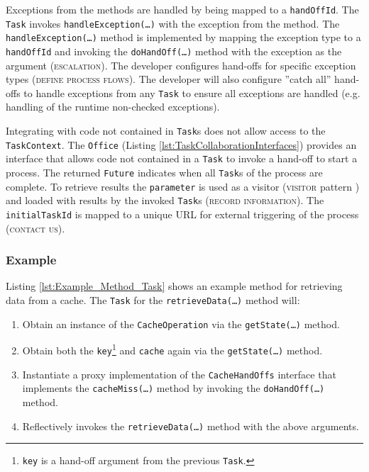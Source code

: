 \documentclass[prodmode]{style/acmlarge}
\begin{document}
Exceptions from the methods are handled by being mapped to a \texttt{handOffId}.
The \texttt{Task} invokes \texttt{handle\-Excep\-tion(\ldots)} with the
exception from the method.  The \texttt{handleException(\ldots)} method is
implemented by mapping the exception type to a \texttt{handOffId} and invoking
the \texttt{doHandOff(\ldots)} method with the exception as the argument
(\textsc{escalation}).  The developer configures hand-offs for specific
exception types (\textsc{define process flows}).  The developer will also
configure ''catch all'' hand-offs to handle exceptions from any \texttt{Task} to
ensure all exceptions are handled (e.g. handling of the runtime non-checked
exceptions).

Integrating with code not contained in \texttt{Task}s does not allow access to
the \texttt{TaskContext}.  The \texttt{Office} (Listing
\ref{lst:TaskCollaborationInterfaces}) provides an interface that allows code
not contained in a \texttt{Task} to invoke a hand-off to start a process.  The
returned \texttt{Future} indicates when all \texttt{Task}s of the process are
complete.  To retrieve results the \texttt{parameter} is used as a visitor
(\textsc{visitor} pattern \cite{gof}) and loaded with results by the invoked
\texttt{Task}s (\textsc{record information}).  The \texttt{initialTaskId} is
mapped to a unique URL for external triggering of the process (\textsc{contact
us}).



\subsubsection*{Example}

Listing \ref{lst:Example_Method_Task} shows an example method for retrieving
data from a cache.  The \texttt{Task} for the \texttt{retrieve\-Data(\ldots)} method will:
\begin{enumerate}
  \item Obtain an instance of the \texttt{CacheOperation} via the \texttt{getState(\ldots)} method.
  \item Obtain both the \texttt{key}\footnote{\texttt{key} is a hand-off argument from the previous \texttt{Task}.} and \texttt{cache} again via the \texttt{getState(\ldots)} method.
  \item Instantiate a proxy implementation of the \texttt{CacheHandOffs} interface that implements the \texttt{cacheMiss(\ldots)} method by invoking the \texttt{doHandOff(\ldots)} method. 
  \item Reflectively invokes the \texttt{retrieveData(\ldots)} method with the above arguments.
\end{enumerate}
\end{document}
